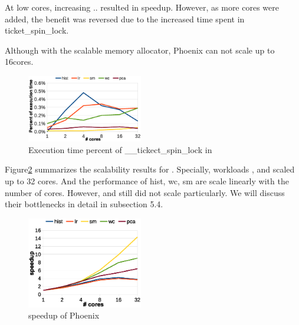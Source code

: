 At low cores, increasing .. resulted in speedup.
However, as more cores were added, the benefit was reversed due to the increased time spent in ticket\_spin\_lock. 


Although with the scalable memory allocator, Phoenix can not scale up to 16cores.
 
\begin{figure}[!h!t]  
	\centering
	\includegraphics[width=0.45\textwidth]{eps/dmr_spinlock.eps}
	\caption{Execution time percent of \_\_tickect\_spin\_lock in \myds}
	\label{fig:smr:spinlock}
\end{figure}

Figure\ref{fig:smr:speedup} summarizes the scalability results for \myds.
Specially, workloads ,  and  scaled up to 32 cores.
And the performance of hist, wc, sm are scale linearly with the number of cores.
However,  and  still did not scale particularly. 
We will discuss their bottlenecks in detail in subsection 5.4.
\begin{figure}[!h!t]  
	\centering
	\includegraphics[width=0.45\textwidth]{eps/dmr_speedup.eps}
	\caption{speedup of Phoenix}
	\label{fig:smr:speedup}
\end{figure}

